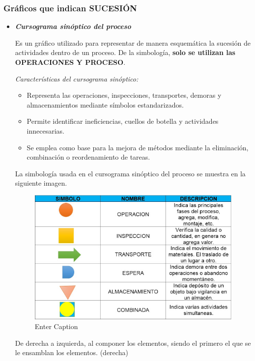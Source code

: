 \documentclass[a4paper,oneside,11pt]{article}
\begin{document}
\subsubsection{Gráficos que indican SUCESIÓN}
\begin{itemize}
    \item \textbf{\textit{Cursograma sinóptico del proceso}}

        Es un gráfico utilizado para representar de manera esquemática la sucesión de actividades dentro de un proceso. De la simbología, \textbf{solo se utilizan las OPERACIONES Y PROCESO}.

        \textit{Características del cursograma sinóptico:}
        \begin{itemize}
            \item Representa las operaciones, inspecciones, transportes, demoras y almacenamientos mediante símbolos estandarizados.
            \item Permite identificar ineficiencias, cuellos de botella y actividades innecesarias.
            \item Se emplea como base para la mejora de métodos mediante la eliminación, combinación o reordenamiento de tareas.
        \end{itemize}

        La simbología usada en el cursograma sinóptico del proceso se muestra en la siguiente imagen.

        \begin{figure} [ht!]
            \centering
            \includegraphics[scale=0.65]{simbologia.png}
            \caption{Enter Caption}
        \end{figure}
        

        De derecha a izquierda, al componer los elementos, siendo el primero el que se le ensamblan los elementos. (derecha)
        

\end{itemize}
\end{document}
